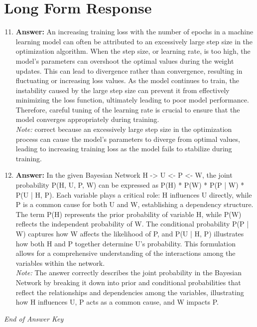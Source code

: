 \documentclass[12pt]{article}
\begin{document}
\section*{Long Form Response}
\begin{enumerate}[label=\arabic*.]
\setcounter{enumi}{10}
\item \textbf{Answer:} An increasing training loss with the number of epochs in a machine learning model can often be attributed to an excessively large step size in the optimization algorithm. When the step size, or learning rate, is too high, the model's parameters can overshoot the optimal values during the weight updates. This can lead to divergence rather than convergence, resulting in fluctuating or increasing loss values. As the model continues to train, the instability caused by the large step size can prevent it from effectively minimizing the loss function, ultimately leading to poor model performance. Therefore, careful tuning of the learning rate is crucial to ensure that the model converges appropriately during training.
\\ \textit{Note:} correct because an excessively large step size in the optimization process can cause the model's parameters to diverge from optimal values, leading to increasing training loss as the model fails to stabilize during training.
\item \textbf{Answer:} In the given Bayesian Network H -\textgreater{} U \textless{}- P \textless{}- W, the joint probability P(H, U, P, W) can be expressed as P(H) * P(W) * P(P | W) * P(U | H, P). Each variable plays a critical role: H influences U directly, while P is a common cause for both U and W, establishing a dependency structure. The term P(H) represents the prior probability of variable H, while P(W) reflects the independent probability of W. The conditional probability P(P | W) captures how W affects the likelihood of P, and P(U | H, P) illustrates how both H and P together determine U's probability. This formulation allows for a comprehensive understanding of the interactions among the variables within the network.
\\ \textit{Note:} The answer correctly describes the joint probability in the Bayesian Network by breaking it down into prior and conditional probabilities that reflect the relationships and dependencies among the variables, illustrating how H influences U, P acts as a common cause, and W impacts P.
\end{enumerate}

\vfill
\noindent\textit{End of Answer Key}
\end{document}
